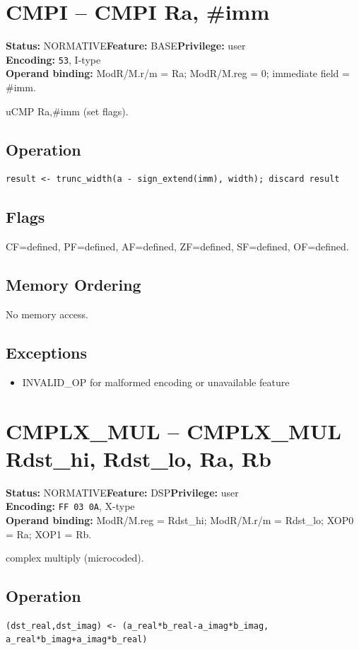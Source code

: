 \documentclass[10pt]{article}
\begin{document}
\section{CMPI -- CMPI Ra, \#imm}
\textbf{Status:} NORMATIVE\quad \textbf{Feature:} BASE\quad \textbf{Privilege:} user\\
\textbf{Encoding:} \texttt{53}, I-type\\
\textbf{Operand binding:} ModR/M.r/m = Ra; ModR/M.reg = 0; immediate field = \#imm.

uCMP Ra,\#imm (set flags).

\subsection*{Operation}
\begin{lstlisting}
result <- trunc_width(a - sign_extend(imm), width); discard result
\end{lstlisting}
\subsection*{Flags}
CF=defined, PF=defined, AF=defined, ZF=defined, SF=defined, OF=defined.
\subsection*{Memory Ordering}
No memory access.
\subsection*{Exceptions}
\begin{itemize}
\item INVALID\_OP for malformed encoding or unavailable feature
\end{itemize}
\clearpage

\section{CMPLX\_MUL -- CMPLX\_MUL Rdst\_hi, Rdst\_lo, Ra, Rb}
\textbf{Status:} NORMATIVE\quad \textbf{Feature:} DSP\quad \textbf{Privilege:} user\\
\textbf{Encoding:} \texttt{FF 03 0A}, X-type\\
\textbf{Operand binding:} ModR/M.reg = Rdst\_hi; ModR/M.r/m = Rdst\_lo; XOP0 = Ra; XOP1 = Rb.

complex multiply (microcoded).

\subsection*{Operation}
\begin{lstlisting}
(dst_real,dst_imag) <- (a_real*b_real-a_imag*b_imag, a_real*b_imag+a_imag*b_real)
\end{lstlisting}
\end{document}
